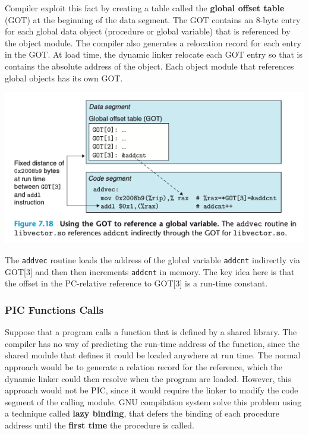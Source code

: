 \documentclass[11pt]{article}
\begin{document}
Compiler exploit this fact by creating a table called the \textbf{global offset table} (GOT) at the beginning of the data segment. The GOT contains an 8-byte entry for each global data object (procedure or global variable) that is referenced by the object module. The compiler also generates a relocation record for each entry in the GOT. At load time, the dynamic linker relocate each GOT entry so that is contains the absolute address of the object. Each object module that references global objects has its own GOT.\\

\begin{center}
\includegraphics[width=.9\linewidth]{pics/figure7.18-got.png}
\end{center}


The \texttt{addvec} routine loads the address of the global variable \texttt{addcnt} indirectly via GOT[3] and then then increments \texttt{addcnt} in memory. The key idea here is that the offset in the PC-relative reference to GOT[3] is a run-time constant.\\

\subsubsection{PIC Functions Calls}
\label{sec:orgb7fb14b}
Suppose that a program calls a function that is defined by a shared library. The compiler has no way of predicting the run-time address of the function, since the shared module that defines it could be loaded anywhere at run time. The normal approach would be to generate a relation record for the reference, which the dynamic linker could then resolve when the program are loaded. However, this approach would not be PIC, since it would require the linker to modify the code segment of the calling module. GNU compilation system solve this problem using a technique called \textbf{lazy binding}, that defers the binding of each procedure address until the \textbf{first time} the procedure is called.\\
\end{document}
